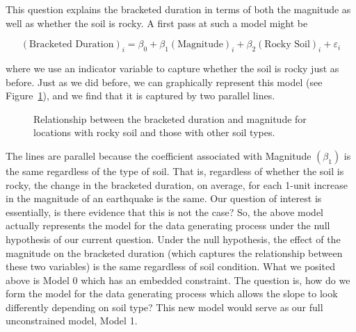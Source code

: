 \documentclass[
  letterpaper,
  DIV=11,
  numbers=noendperiod]{scrreprt}
\theoremstyle{plain}
\theoremstyle{definition}
\theoremstyle{definition}
\theoremstyle{remark}
\begin{document}
This question explains the bracketed duration in terms of both the
magnitude as well as whether the soil is rocky. A first pass at such a
model might be

\[
(\text{Bracketed Duration})_i = \beta_0 + \beta_1(\text{Magnitude})_i + \beta_2(\text{Rocky Soil})_i + \varepsilon_i
\]

where we use an indicator variable to capture whether the soil is rocky
just as before. Just as we did before, we can graphically represent this
model (see Figure~\ref{fig-regextensions-ind-plot2}), and we find that
it is captured by two parallel lines.

\begin{figure}


\caption{\label{fig-regextensions-ind-plot2}Relationship between the
bracketed duration and magnitude for locations with rocky soil and those
with other soil types.}

\end{figure}%

The lines are parallel because the coefficient associated with Magnitude
\(\left(\beta_1\right)\) is the same regardless of the type of soil.
That is, regardless of whether the soil is rocky, the change in the
bracketed duration, on average, for each 1-unit increase in the
magnitude of an earthquake is the same. Our question of interest is
essentially, is there evidence that this is not the case? So, the above
model actually represents the model for the data generating process
under the null hypothesis of our current question. Under the null
hypothesis, the effect of the magnitude on the bracketed duration (which
captures the relationship between these two variables) is the same
regardless of soil condition. What we posited above is Model 0 which has
an embedded constraint. The question is, how do we form the model for
the data generating process which allows the slope to look differently
depending on soil type? This new model would serve as our full
unconstrained model, Model 1.
\end{document}
